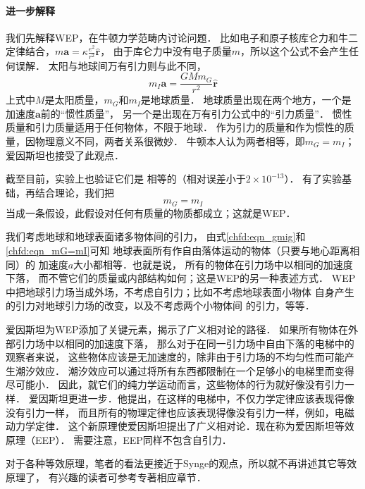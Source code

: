 \paragraph{进一步解释}
我们先解释WEP，在牛顿力学范畴内讨论问题．
比如电子和原子核库仑力和牛二定律结合，$m \boldsymbol{a}= \kappa \frac{e^2}{r^2} \hat{\boldsymbol{r}}$，
由于库仑力中没有电子质量$m$，所以这个公式不会产生任何误解．
太阳与地球间万有引力则与此不同，
\begin{equation}\label{chfd:eqn_gmig}
    m_I \boldsymbol{a} = \frac{GM m_G}{r^2 } \hat{\boldsymbol{r}}
\end{equation}
上式中$M$是太阳质量，$m_G$和$m_I$是地球质量．
地球质量出现在两个地方，一个是加速度$\boldsymbol{a}$前的“惯性质量”，
另一个是出现在万有引力公式中的“引力质量”．
惯性质量和引力质量适用于任何物体，不限于地球．
作为引力的质量和作为惯性的质量，因物理意义不同，两者关系很微妙．
牛顿本人认为两者相等，即$m_G=m_I$；爱因斯坦也接受了此观点．

截至目前，实验\cite[\S 2.3.1]{will_tegp-2018}上也验证它们是
相等的（相对误差小于$2\times 10^{-13}$）．
有了实验基础，再结合理论，我们把
\begin{equation}\label{chfd:eqn_mG=mI}
    m_G=m_I
\end{equation}
当成一条{\heiti 假设}，此假设对任何有质量的物质都成立；这就是WEP．

我们考虑地球和地球表面诸多物体间的引力，
由式\eqref{chfd:eqn_gmig}和\eqref{chfd:eqn_mG=mI}可知
地球表面所有作自由落体运动的物体（只要与地心距离相同）的
加速度$a$大小都相等．也就是说，
所有的物体在引力场中以相同的加速度下落，
而不管它们的质量或内部结构如何；这是WEP的另一种表述方式．
WEP中把地球引力场当成外场，不考虑自引力；比如不考虑地球表面小物体
自身产生的引力对地球引力场的改变，以及不考虑两个小物体间
的引力，等等．



爱因斯坦为WEP添加了关键元素，揭示了广义相对论的路径．
如果所有物体在外部引力场中以相同的加速度下落，
那么对于在同一引力场中自由下落的电梯中的观察者来说，
这些物体应该是无加速度的，除非由于引力场的不均匀性而可能产生潮汐效应．
潮汐效应可以通过将所有东西都限制在一个足够小的电梯里而变得尽可能小．
因此，就它们的纯力学运动而言，这些物体的行为就好像没有引力一样．
爱因斯坦更进一步．他提出，在这样的电梯中，不仅力学定律应该表现得像没有引力一样，
而且所有的物理定律也应该表现得像没有引力一样，例如，电磁动力学定律．
这个新原理使爱因斯坦提出了广义相对论．现在称为爱因斯坦等效原理（EEP）．
需要注意，EEP同样不包含自引力．


对于各种等效原理，笔者的看法更接近于Synge的观点，所以就不再讲述其它等效原理了，
有兴趣的读者可参考专著\parencite{will_tegp-2018}相应章节．



